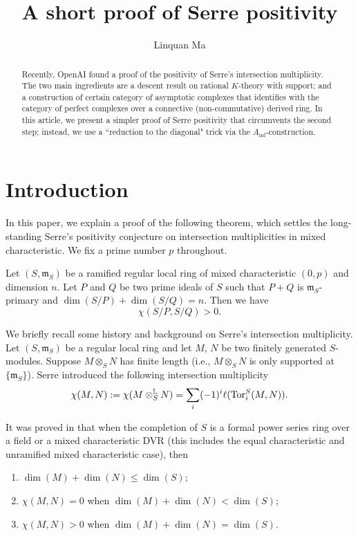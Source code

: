 \documentclass[12pt]{amsart}
\numberwithin{equation}{theorem}
\numberwithin{equation}{theorem}
\renewcommand{\m}{\mathfrak{m}}
\begin{document}
\title{A short proof of Serre positivity}

\author{Linquan Ma}


\address{Department of Mathematics, Purdue University, West Lafayette, IN, USA}

\begin{abstract}
Recently, OpenAI found a proof of the positivity of Serre's intersection multiplicity. The two main ingredients are a descent result on rational $K$-theory with support; and a construction of certain category of asymptotic complexes that identifies with the category of perfect complexes over a connective (non-commutative) derived ring. In this article, we present a simpler proof of Serre positivity that circumvents the second step; instead, we use a ``reduction to the diagonal" trick via the $A_{\text{inf}}$-construction. 
\end{abstract}

\maketitle

\section{Introduction}

In this paper, we explain a proof of the following theorem, which settles the long-standing Serre's positivity conjecture \cite{SerreBookLocalAlgebra1965} on intersection multiplicities in mixed characteristic. We fix a prime number $p$ throughout.

\begin{theorem}
\label{theorem: Serre positivity}
Let $(S,\m_S)$ be a ramified regular local ring of mixed characteristic $(0,p)$ and dimension $n$. Let $P$ and $Q$ be two prime ideals of $S$ such that $P+Q$ is $\m_S$-primary and $\dim(S/P) + \dim(S/Q) =n$. Then we have 
$$\chi(S/P, S/Q)>0.$$
\end{theorem}

We briefly recall some history and background on Serre's intersection multiplicity. Let $(S,\m_S)$ be a regular local ring and let $M$, $N$ be two finitely generated $S$-modules. Suppose $M\otimes_SN$ has finite length (i.e., $M\otimes_SN$ is only supported at $\{\m_S\}$). Serre introduced the following intersection multiplicity 
$$\chi(M, N) : = \chi(M\otimes^{\mathbb{L}}_S N) = \sum_i (-1)^i\ell(\operatorname{{Tor}}_i^S(M,N)).$$

It was proved in \cite{SerreBookLocalAlgebra1965} that when the completion of $S$ is a formal power series ring over a field or a mixed characteristic DVR (this includes the equal characteristic and unramified mixed characteristic case), then 
\begin{enumerate}
    \item $\dim(M) + \dim(N) \leq \dim(S)$;
    \item $\chi(M, N)=0$ when $\dim(M) + \dim(N) <\dim(S)$;
    \item $\chi(M, N)>0$ when $\dim(M) + \dim(N) =\dim(S)$.
\end{enumerate}
\end{document}
